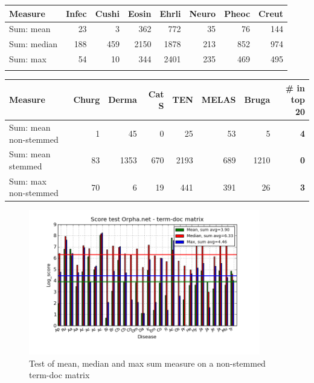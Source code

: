 \begin{table}[H]
  \begin{tiny}
  \label{testResult}
  \begin{tabular}{|l|r|r|r|r|r|r|r|}
    \hline
    Measure &Infec&Cushi&Eosin&Ehrli&Neuro&Pheoc&Creut \\
    \hline
    Sum: mean &23&3&362&772&35&76&144 \\
    \hline
    Sum: median &188&459&2150&1878&213&852&974 \\
    \hline
    Sum: max &54&10&344&2401&235&469&495  \\
    \hline
  \multicolumn{8}{c}{} \\
  \end{tabular}
  \begin{tabular}{|l|r|r|r|r|r|r|r|}
    \hline
    Measure &Churg&Derma&Cat S&TEN&MELAS&Bruga& \scriptsize{\textbf{\# in top 20}} \\
    \hline
    Sum: mean non-stemmed &1&45&0&25&53&5& \scriptsize{\textbf{4}} \\
    \hline
    Sum: mean stemmed &83&1353&670&2193&689&1210 &  \scriptsize{\textbf{0}}\\
    \hline
    Sum: max non-stemmed &70&6&19&441&391&26 & \scriptsize{\textbf{3}} \\
    \hline
  \end{tabular}
  \end{tiny}
\end{table}

\begin{figure}[H]
        \begin{center}
          \includegraphics[width=0.9\textwidth]{barcharts/termDoc_orphan_hist_3000_ns_mea_med_max_sum.png}
        \end{center}
        \caption{Test of mean, median and max sum measure on a non-stemmed term-doc matrix}
        \label{termDoc_orphan_hist_3000_ns_mea_med_max_sum}
\end{figure}

